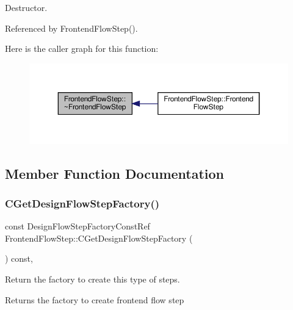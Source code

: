 Destructor. 



Referenced by Frontend\+Flow\+Step().

Here is the caller graph for this function\+:
\nopagebreak
\begin{figure}[H]
\begin{center}
\leavevmode
\includegraphics[width=350pt]{d9/d37/classFrontendFlowStep_aa7a56912287bccb3c1c9df2a9be1a82c_icgraph}
\end{center}
\end{figure}


\subsection{Member Function Documentation}
\mbox{\label{classFrontendFlowStep_a6d36a52be3de210e018389f802f940a7}} 
\subsubsection{\texorpdfstring{C\+Get\+Design\+Flow\+Step\+Factory()}{CGetDesignFlowStepFactory()}}
{\footnotesize\ttfamily const Design\+Flow\+Step\+Factory\+Const\+Ref Frontend\+Flow\+Step\+::\+C\+Get\+Design\+Flow\+Step\+Factory (\begin{DoxyParamCaption}{ }\end{DoxyParamCaption}) const\hspace{0.3cm}{\ttfamily [override]}, {\ttfamily [virtual]}}



Return the factory to create this type of steps. 

\begin{DoxyReturn}{Returns}
the factory to create frontend flow step 
\end{DoxyReturn}


